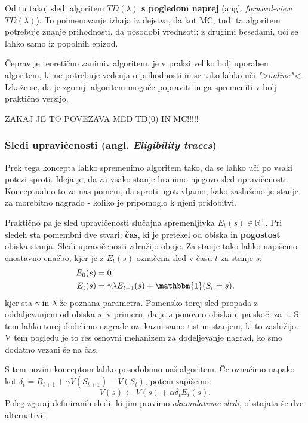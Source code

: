 \documentclass[12pt,a4paper]{amsart}
\theoremstyle{definition} %
\theoremstyle{plain} %
\begin{document}
Od tu takoj sledi algoritem \textbf{$TD(\lambda)$ s pogledom naprej} (angl. \textit{forward-view 
$TD(\lambda)$}). To poimenovanje izhaja iz dejstva, da kot MC, tudi ta algoritem potrebuje znanje
prihodnosti, da posodobi vrednsoti; z drugimi besedami, uči se lahko samo iz popolnih epizod.

Čeprav je teoretično zanimiv algoritem, je v praksi veliko bolj uporaben algoritem, ki ne potrebuje
vedenja o prihodnosti in se tako lahko uči \textit{">online"<}. Izkaže se, da je zgornji algoritem 
mogoče popraviti in ga spremeniti v bolj praktično verzijo.

ZAKAJ JE TO POVEZAVA MED TD(0) IN MC!!!!!

\subsubsection{Sledi upravičenosti (angl. \textit{Eligibility traces})}
Prek tega koncepta lahko spremenimo algoritem tako, da se lahko uči po vsaki potezi sproti. Ideja 
je, da za vsako stanje hranimo njegovo sled upravičenosti. Konceptualno to za nas pomeni, da sproti 
ugotavljamo, kako zasluženo je stanje za morebitno nagrado - koliko je pripomoglo k njeni 
pridobitvi.

Praktično pa je sled upravičenosti slučajna spremenljivka $E_t(s) \in \mathbb{R}^+$. Pri sledeh 
sta pomembni dve stvari: \textbf{čas}, ki je pretekel od obiska in \textbf{pogostost} obiska 
stanja. Sledi upravičenosti združijo oboje. Za stanje tako lahko napišemo enostavno enačbo, 
kjer je z $E_t(s)$ označena sled v času $t$ za stanje $s$:
\begin{align*}
    E_0(s) &= 0 \\
    E_t(s) &= \gamma \lambda E_{t-1}(s) + \mathbbm{1}(S_t = s),
\end{align*}
kjer sta $\gamma$ in $\lambda$ že poznana parametra. Pomensko torej sled propada z oddaljevanjem 
od obiska $s$, v primeru, da je $s$ ponovno obiskan, pa skoči za $1$. S tem lahko torej dodelimo 
nagrade oz. kazni samo tistim stanjem, ki to zaslužijo. V tem pogledu je to res osnovni mehanizem 
za dodeljevanje nagrad, ko smo dodatno vezani še na čas.

S tem novim konceptom lahko posodobimo naš algoritem. Če označimo napako kot $\delta_t = R_{t+1} + 
\gamma V(S_{t+1}) - V(S_t)$, potem zapišemo: 
\begin{equation}\label{TDlambda}
    V(s) \leftarrow V(s) + \alpha \delta_t E_t(s).
\end{equation}
Poleg zgoraj definiranih sledi, ki jim pravimo \textit{akumulativne sledi}, obstajata še dve 
alternativi:
\end{document}
